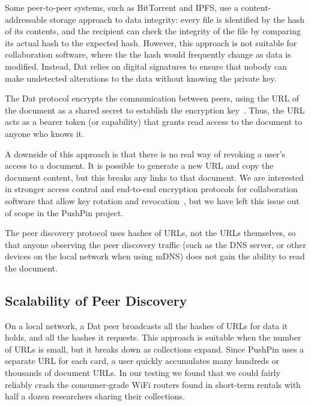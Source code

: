 \documentclass[sigplan,10pt]{acmart}
\begin{document}
Some peer-to-peer systems, such as BitTorrent and IPFS, use a content-addressable storage approach to data integrity: every file is identified by the hash of its contents, and the recipient can check the integrity of the file by comparing its actual hash to the expected hash. However, this approach is not suitable for collaboration software, where the the hash would frequently change as data is modified. Instead, Dat relies on digital signatures to ensure that nobody can make undetected alterations to the data without knowing the private key.

The Dat protocol encrypts the communication between peers, using the URL of the document as a shared secret to establish the encryption key~\cite{HowDatWorks}.
Thus, the URL acts as a bearer token (or capability) that grants read access to the document to anyone who knows it.

A downside of this approach is that there is no real way of revoking a user's access to a document.
It is possible to generate a new URL and copy the document content, but this breaks any links to that document.
We are interested in stronger access control and end-to-end encryption protocols for collaboration software that allow key rotation and revocation~\cite{Kleppmann:2018tk}, but we have left this issue out of scope in the PushPin project.

The peer discovery protocol uses hashes of URLs, not the URLs themselves, so that anyone observing the peer discovery traffic (such as the DNS server, or other devices on the local network when using mDNS) does not gain the ability to read the document.

\subsection{Scalability of Peer Discovery}

On a local network, a Dat peer broadcasts all the hashes of URLs for data it holds, and all the hashes it requests.
This approach is suitable when the number of URLs is small, but it breaks down as collections expand.
Since PushPin uses a separate URL for each card, a user quickly accumulates many hundreds or thousands of document URLs.
In our testing we found that we could fairly reliably crash the consumer-grade WiFi routers found in short-term rentals with half a dozen researchers sharing their collections.

\end{document}
